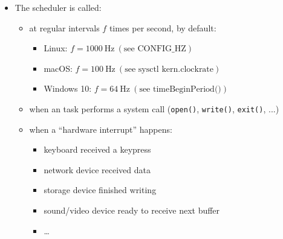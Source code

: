 \documentclass[12pt]{article}
\begin{document}
\begin{itemize}
  \item The scheduler is called:
  \begin{itemize}
    \item at regular intervals $f$ times per second, by default:
    \begin{itemize}
      \item Linux: $f = 1000\ \text{Hz}\ (\text{see CONFIG\_HZ})$
      \item macOS: $f = 100\ \text{Hz}\ (\text{see sysctl kern.clockrate})$
      \item Windows 10: $f = 64\ \text{Hz}\ (\text{see timeBeginPeriod()})$
    \end{itemize}
    \item when an task performs a system call (\texttt{open()}, \texttt{write()}, \texttt{exit()}, ...)
    \item when a ``hardware interrupt'' happens:
    \begin{itemize}
      \item keyboard received a keypress
      \item network device received data
      \item storage device finished writing
      \item sound/video device ready to receive next buffer
      \item \ldots
    \end{itemize}
  \end{itemize}
\end{itemize}
\end{document}
